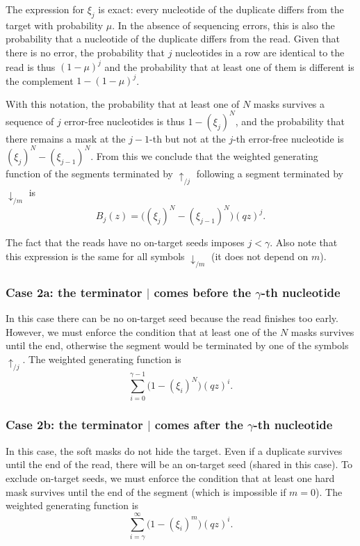 \documentclass{article}
\begin{document}
The expression for $\xi_j$ is exact: every nucleotide of the duplicate
differs from the target with probability $\mu$. In the absence of
sequencing errors, this is also the probability that a nucleotide of the
duplicate differs from the read. Given that there is no error, the
probability that $j$ nucleotides in a row are identical to the read is
thus $(1-\mu)^j$ and the probability that at least one of them is
different is the complement $1-(1-\mu)^j$.

With this notation, the probability that at least one of $N$ masks
survives a sequence of $j$ error-free nucleotides is thus $1-(\xi_j)^N$,
and the probability that there remains a mask at the $j-1$-th but not at
the $j$-th error-free nucleotide is $(\xi_j)^N - (\xi_{j-1})^N$. From this
we conclude that the weighted generating function of the segments
terminated by $\uparrow_{/j}$ following a segment terminated by
$\downarrow_{/m}$ is
\begin{equation}
\label{eq:B}
B_j(z) = \Big( (\xi_j)^N-(\xi_{j-1})^N \Big) (qz)^j.
\end{equation}

The fact that the reads have no on-target seeds imposes $j < \gamma$. Also
note that this expression is the same for all symbols $\downarrow_{/m}$
(it does not depend on $m$).

\subsubsection*{Case 2a: the terminator $|$ comes before the $\gamma$-th
nucleotide}

In this case there can be no on-target seed because the read finishes too
early. However, we must enforce the condition that at least one of the $N$
masks survives until the end, otherwise the segment would be terminated by
one of the symbols $\uparrow_{/j}$. The weighted generating function is
\begin{equation*}
\sum_{i=0}^{\gamma-1} \Big(1 - (\xi_i)^N \Big) (qz)^i.
\end{equation*}

\subsubsection*{Case 2b: the terminator $|$ comes after the $\gamma$-th
nucleotide}

In this case, the soft masks do not hide the target. Even if a duplicate
survives until the end of the read, there will be an on-target seed
(shared in this case). To exclude on-target seeds, we must enforce the
condition that at least one hard mask survives until the end of the
segment (which is impossible if $m = 0$). The weighted generating function
is
\begin{equation*}
\sum_{i=\gamma}^\infty \Big(1 - (\xi_i)^m \Big) (qz)^i.
\end{equation*}
\end{document}
